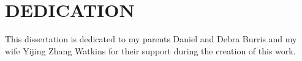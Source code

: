
\chapter*{DEDICATION}


This dissertation is dedicated to my parents Daniel and Debra Burris and my wife Yijing Zhang Watkins for their support during the creation of this work.

\newpage
